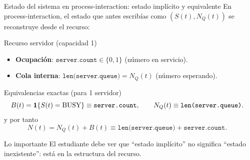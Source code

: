 \documentclass[aspectratio=1610, 9pt]{beamer}
\begin{document}
\begin{frame}{Estado del sistema en process-interaction: estado implícito y equivalente}
\small
En process-interaction, el estado que antes escribías como $(S(t),N_Q(t))$ se reconstruye desde el recurso:

\vspace{4pt}
\begin{block}{Recurso servidor (capacidad 1)}
\begin{itemize}
\item \textbf{Ocupación}: $\texttt{server.count}\in\{0,1\}$ (número en servicio).
\item \textbf{Cola interna}: $\texttt{len(server.queue)} = N_Q(t)$ (número esperando).
\end{itemize}
\end{block}

\vspace{4pt}
\begin{block}{Equivalencias exactas (para 1 servidor)}
\[
B(t)=\mathbf{1}\{S(t)=\text{BUSY}\} \equiv \texttt{server.count},
\qquad
N_Q(t)\equiv \texttt{len(server.queue)}.
\]
y por tanto
\[
N(t)=N_Q(t)+B(t)\equiv \texttt{len(server.queue)}+\texttt{server.count}.
\]
\end{block}

\vspace{2pt}
\begin{alertblock}{Lo importante}
El estudiante debe ver que “estado implícito” no significa “estado inexistente”: está en la estructura del recurso.
\end{alertblock}
\end{frame}
\end{document}
